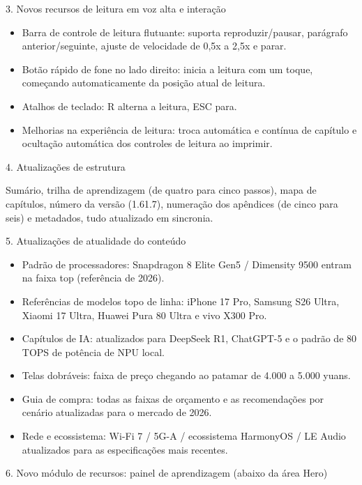 3. Novos recursos de leitura em voz alta e interação

\begin{itemize}
  \item Barra de controle de leitura flutuante: suporta reproduzir/pausar, parágrafo anterior/seguinte, ajuste de velocidade de 0,5x a 2,5x e parar.
  \item Botão rápido de fone no lado direito: inicia a leitura com um toque, começando automaticamente da posição atual de leitura.
  \item Atalhos de teclado: R alterna a leitura, ESC para.
  \item Melhorias na experiência de leitura: troca automática e contínua de capítulo e ocultação automática dos controles de leitura ao imprimir.
\end{itemize}

4. Atualizações de estrutura

Sumário, trilha de aprendizagem (de quatro para cinco passos), mapa de capítulos, número da versão (1.61.7), numeração dos apêndices (de cinco para seis) e metadados, tudo atualizado em sincronia.

5. Atualizações de atualidade do conteúdo

\begin{itemize}
  \item Padrão de processadores: Snapdragon 8 Elite Gen5 / Dimensity 9500 entram na faixa top (referência de 2026).
  \item Referências de modelos topo de linha: iPhone 17 Pro, Samsung S26 Ultra, Xiaomi 17 Ultra, Huawei Pura 80 Ultra e vivo X300 Pro.
  \item Capítulos de IA: atualizados para DeepSeek R1, ChatGPT-5 e o padrão de 80 TOPS de potência de NPU local.
  \item Telas dobráveis: faixa de preço chegando ao patamar de 4.000 a 5.000 yuans.
  \item Guia de compra: todas as faixas de orçamento e as recomendações por cenário atualizadas para o mercado de 2026.
  \item Rede e ecossistema: Wi-Fi 7 / 5G-A / ecossistema HarmonyOS / LE Audio atualizados para as especificações mais recentes.
\end{itemize}

6. Novo módulo de recursos: painel de aprendizagem (abaixo da área Hero)

